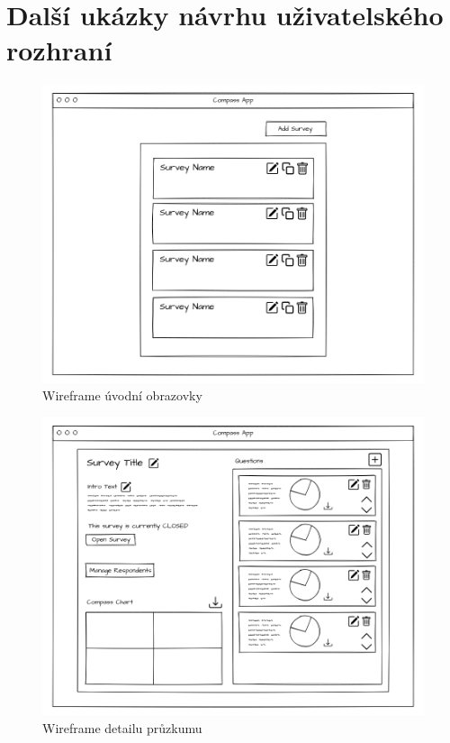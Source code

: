 \chapter{Další ukázky návrhu uživatelského rozhraní}
\label{ap:wireframes}

\begin{figure}[h!]
    \centering
    \includegraphics[width=\textwidth]{images/wireframes/Survey_List.png}
    \caption{Wireframe úvodní obrazovky}
\end{figure}

\begin{figure}[h!]
    \centering
    \includegraphics[width=\textwidth]{images/wireframes/Survey_Edit.png}
    \caption{Wireframe detailu průzkumu}
\end{figure}

